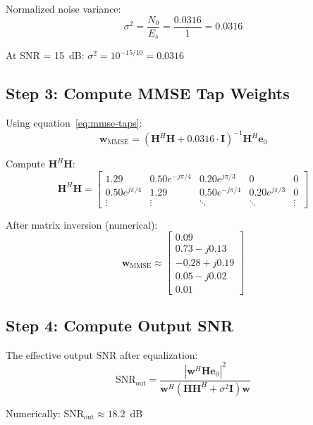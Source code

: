 Normalized noise variance:
\begin{equation}
\sigma^2 = \frac{N_0}{E_s} = \frac{0.0316}{1} = 0.0316
\end{equation}

At SNR = 15~dB: $\sigma^2 = 10^{-15/10} = 0.0316$

\subsection*{Step 3: Compute MMSE Tap Weights}

Using equation~\eqref{eq:mmse-taps}:
\begin{equation}
\mathbf{w}_{\text{MMSE}} = (\mathbf{H}^H \mathbf{H} + 0.0316 \cdot \mathbf{I})^{-1} \mathbf{H}^H \mathbf{e}_0
\end{equation}

Compute $\mathbf{H}^H \mathbf{H}$:
\begin{equation}
\mathbf{H}^H \mathbf{H} = \begin{bmatrix}
1.29 & 0.50e^{-j\pi/4} & 0.20e^{j\pi/3} & 0 & 0 \\
0.50e^{j\pi/4} & 1.29 & 0.50e^{-j\pi/4} & 0.20e^{j\pi/3} & 0 \\
\vdots & \vdots & \ddots & \ddots & \vdots
\end{bmatrix}
\end{equation}

After matrix inversion (numerical):
\begin{equation}
\mathbf{w}_{\text{MMSE}} \approx \begin{bmatrix}
0.09 \\
0.73 - j0.13 \\
-0.28 + j0.19 \\
0.05 - j0.02 \\
0.01
\end{bmatrix}
\end{equation}

\subsection*{Step 4: Compute Output SNR}

The effective output SNR after equalization:
\begin{equation}
\text{SNR}_{\text{out}} = \frac{|\mathbf{w}^H \mathbf{H} \mathbf{e}_0|^2}{\mathbf{w}^H (\mathbf{H} \mathbf{H}^H + \sigma^2 \mathbf{I}) \mathbf{w}}
\end{equation}

Numerically: $\text{SNR}_{\text{out}} \approx 18.2$~dB

